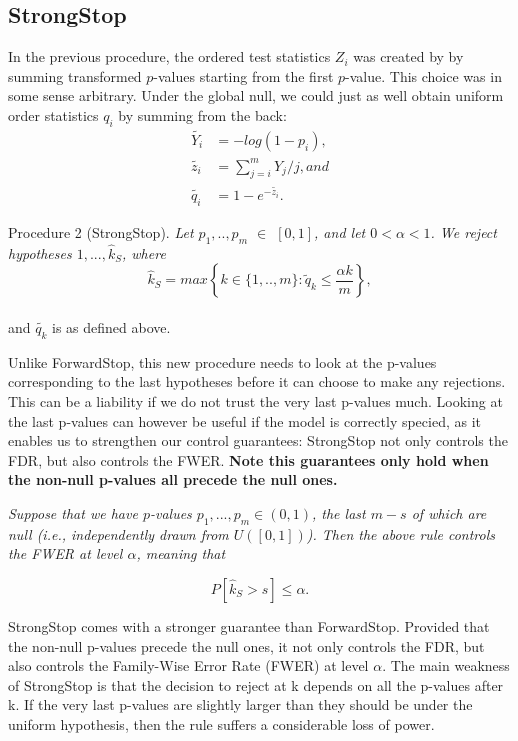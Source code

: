 \documentclass{article}
\begin{document}
\subsection{StrongStop}
In the previous procedure,  the ordered test statistics $Z_i$ was created by by summing transformed $p$-values starting from the first $p$-value. This choice was in some sense arbitrary. Under the global null, we could just as well obtain uniform order statistics $q_i$ by summing from the back:
\begin{align*}
\tilde{Y_i} &= -log(1-p_i), \\
\tilde{z_i} &=\sum_{j=i}^{m}Y_j/j, and  \\
\tilde{q_i} &= 1- e^{-\tilde{z_i}}. 
\end{align*}

\large{Procedure 2 (StrongStop).} 	\textit{Let $p_1,..,p_m$ $\in$ $[0,1]$, and let $0 < \alpha <1$. We reject hypotheses $1,..., \hat{k}_S$, where}
$$  \hat{k}_S = max \left\{ k \in \{1,..,m\} : \tilde{q}_k \leq \frac{\alpha k}{m} \right\},$$ \\
and $\tilde{q_k}$ is as defined above.


Unlike ForwardStop, this new procedure needs to look at the p-values corresponding to the last hypotheses before it can choose to make any rejections. This can be a liability if we do not trust the very last p-values much. Looking at the last p-values can however be useful if the model is correctly specied, as it enables us to strengthen our control guarantees: StrongStop not only controls the FDR, but also controls the FWER. \textbf{Note this guarantees only hold when the non-null p-values all precede the null ones.}

\vspace{1cm}

\textit{Suppose that we have $p$-values $p_1,...,p_m \in (0,1)$, the last $m-s$ of which are null (i.e., independently drawn from $U([0, 1])$). Then the above rule controls  the FWER at level $\alpha$, meaning that}

$$ P \left[\hat k_S > s \right] \leq \alpha. $$
\vspace{1cm}

StrongStop comes with a stronger guarantee than ForwardStop. Provided that the non-null p-values precede the null ones, it not only controls the FDR, but also controls the Family-Wise Error Rate (FWER) at level $\alpha$. The main weakness of StrongStop is that the decision to reject at k depends on all the p-values after k. If the very last p-values are slightly larger than they should be under the uniform hypothesis, then the rule suffers a considerable loss of power.
\end{document}
